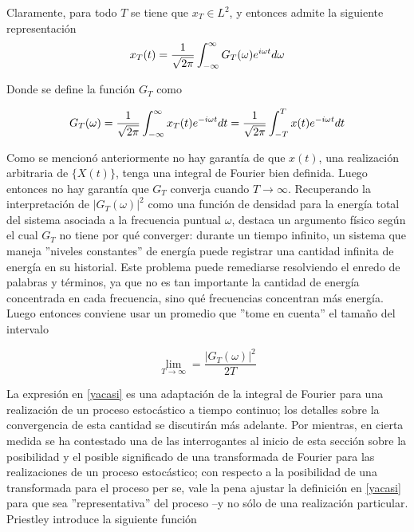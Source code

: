 Claramente, para todo $T$ se tiene que $x_T \in L^2$, y entonces admite la siguiente 
representaci\'on
\begin{equation}
x_T (t) = \frac{1}{\sqrt{2 \pi}} \int_{-\infty}^{\infty} G_T(\omega) e^{i \omega t} d\omega
\end{equation}

Donde se define la funci\'on $G_T$ como

\begin{equation}
G_T (\omega) = \frac{1}{\sqrt{2 \pi}} \int_{-\infty}^{\infty} x_T(t) e^{-i \omega t} dt
= \frac{1}{\sqrt{2 \pi}} \int_{-T}^{T} x(t) e^{-i \omega t} dt
\end{equation}

Como se mencion\'o anteriormente no hay garant\'ia de que $x(t)$, una realizaci\'on arbitraria de
$\{X(t)\}$, tenga una integral de Fourier bien definida. Luego entonces no hay garant\'ia que 
$G_T$ converja cuando $T\rightarrow \infty$. Recuperando la interpretaci\'on de 
$\left| G_T(\omega) \right|^{2}$ como una funci\'on de densidad para la energ\'ia total del sistema 
asociada a la frecuencia
puntual $\omega$, destaca un argumento f\'isico seg\'un el cual $G_T$ no tiene por qu\'e converger:
durante un tiempo infinito, un sistema que maneja ''niveles constantes'' de 
energ\'ia puede registrar una cantidad infinita de energ\'ia en su historial. 
Este problema puede remediarse resolviendo el enredo de palabras y t\'erminos, 
ya que no es tan importante la
cantidad de energ\'ia concentrada en cada frecuencia, sino qu\'e frecuencias concentran m\'as
energ\'ia. Luego entonces conviene usar un promedio que ''tome en cuenta'' el tama\~no
del intervalo

\begin{equation}
\lim_{T\rightarrow{\infty}} = \frac{ \left| G_T(\omega) \right|^{2}}{2 T}
\label{yacasi}
\end{equation}

La expresi\'on en \ref{yacasi} es una adaptaci\'on de la integral de Fourier para una realizaci\'on
de un proceso estoc\'astico a tiempo continuo; los detalles sobre la convergencia de esta 
cantidad se discutir\'an m\'as adelante.
Por mientras, en cierta medida se ha contestado una de las interrogantes al inicio de esta 
secci\'on sobre la posibilidad y
el posible significado de una transformada de Fourier para las realizaciones de un proceso 
estoc\'astico; con respecto a la posibilidad de una transformada para el proceso per se, vale la 
pena
ajustar la definici\'on en \ref{yacasi} para que sea ''representativa'' del proceso --y no s\'olo
de una realizaci\'on particular. Priestley introduce la siguiente funci\'on

